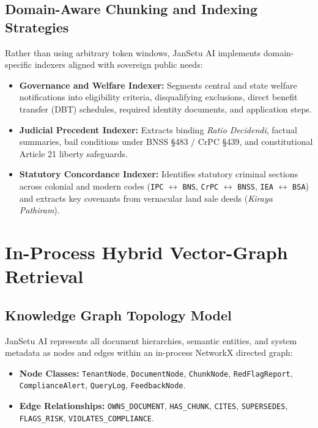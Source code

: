 \documentclass[12pt,a4paper,oneside]{report}
\begin{document}
\section{Domain-Aware Chunking and Indexing Strategies}
Rather than using arbitrary token windows, JanSetu AI implements domain-specific indexers aligned with sovereign public needs:
\begin{itemize}[itemsep=2pt]
    \item \textbf{Governance and Welfare Indexer:} Segments central and state welfare notifications into eligibility criteria, disqualifying exclusions, direct benefit transfer (DBT) schedules, required identity documents, and application steps.
    \item \textbf{Judicial Precedent Indexer:} Extracts binding \textit{Ratio Decidendi}, factual summaries, bail conditions under BNSS \S 483 / CrPC \S 439, and constitutional Article 21 liberty safeguards.
    \item \textbf{Statutory Concordance Indexer:} Identifies statutory criminal sections across colonial and modern codes (\texttt{IPC} $\leftrightarrow$ \texttt{BNS}, \texttt{CrPC} $\leftrightarrow$ \texttt{BNSS}, \texttt{IEA} $\leftrightarrow$ \texttt{BSA}) and extracts key covenants from vernacular land sale deeds (\textit{Kiraya Pathiram}).
\end{itemize}

\newpage

\chapter{In-Process Hybrid Vector-Graph Retrieval}

\section{Knowledge Graph Topology Model}
JanSetu AI represents all document hierarchies, semantic entities, and system metadata as nodes and edges within an in-process NetworkX directed graph:
\begin{itemize}[itemsep=2pt]
    \item \textbf{Node Classes:} \texttt{TenantNode}, \texttt{DocumentNode}, \texttt{ChunkNode}, \texttt{RedFlagReport}, \texttt{ComplianceAlert}, \texttt{QueryLog}, \texttt{FeedbackNode}.
    \item \textbf{Edge Relationships:} \texttt{OWNS\_DOCUMENT}, \texttt{HAS\_CHUNK}, \texttt{CITES}, \texttt{SUPERSEDES}, \texttt{FLAGS\_RISK}, \texttt{VIOLATES\_COMPLIANCE}.
\end{itemize}
\end{document}
